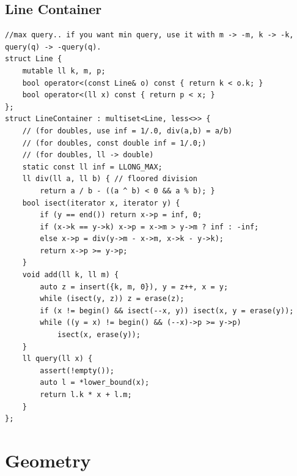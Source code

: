 \documentclass[landscape, 8pt, a4paper, oneside, twocolumn]{extarticle}
\begin{document}
\subsection {Line Container}
\begin{verbatim}
//max query.. if you want min query, use it with m -> -m, k -> -k, query(q) -> -query(q).
struct Line {
    mutable ll k, m, p;
    bool operator<(const Line& o) const { return k < o.k; }
    bool operator<(ll x) const { return p < x; }
};
struct LineContainer : multiset<Line, less<>> {
    // (for doubles, use inf = 1/.0, div(a,b) = a/b)
    // (for doubles, const double inf = 1/.0;)
    // (for doubles, ll -> double)
    static const ll inf = LLONG_MAX;
    ll div(ll a, ll b) { // floored division
        return a / b - ((a ^ b) < 0 && a % b); }
    bool isect(iterator x, iterator y) {
        if (y == end()) return x->p = inf, 0;
        if (x->k == y->k) x->p = x->m > y->m ? inf : -inf;
        else x->p = div(y->m - x->m, x->k - y->k);
        return x->p >= y->p;
    }
    void add(ll k, ll m) {
        auto z = insert({k, m, 0}), y = z++, x = y;
        while (isect(y, z)) z = erase(z);
        if (x != begin() && isect(--x, y)) isect(x, y = erase(y));
        while ((y = x) != begin() && (--x)->p >= y->p)
            isect(x, erase(y));
    }
    ll query(ll x) {
        assert(!empty());
        auto l = *lower_bound(x);
        return l.k * x + l.m;
    }
};
\end{verbatim}
\newpage
\section{Geometry}
\end{document}
